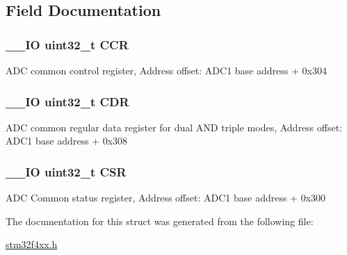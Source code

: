 \subsection{Field Documentation}
\hypertarget{struct_a_d_c___common___type_def_a5e1322e27c40bf91d172f9673f205c97}{
\subsubsection[{C\-C\-R}]{\setlength{\rightskip}{0pt plus 5cm}\-\_\-\-\_\-\-I\-O uint32\-\_\-t C\-C\-R}}\label{struct_a_d_c___common___type_def_a5e1322e27c40bf91d172f9673f205c97}
A\-D\-C common control register, Address offset\-: A\-D\-C1 base address + 0x304 \hypertarget{struct_a_d_c___common___type_def_a760f86a1a18dffffda54fc15a977979f}{
\subsubsection[{C\-D\-R}]{\setlength{\rightskip}{0pt plus 5cm}\-\_\-\-\_\-\-I\-O uint32\-\_\-t C\-D\-R}}\label{struct_a_d_c___common___type_def_a760f86a1a18dffffda54fc15a977979f}
A\-D\-C common regular data register for dual A\-N\-D triple modes, Address offset\-: A\-D\-C1 base address + 0x308 \hypertarget{struct_a_d_c___common___type_def_a876dd0a8546697065f406b7543e27af2}{
\subsubsection[{C\-S\-R}]{\setlength{\rightskip}{0pt plus 5cm}\-\_\-\-\_\-\-I\-O uint32\-\_\-t C\-S\-R}}\label{struct_a_d_c___common___type_def_a876dd0a8546697065f406b7543e27af2}
A\-D\-C Common status register, Address offset\-: A\-D\-C1 base address + 0x300 

The documentation for this struct was generated from the following file\-:\begin{DoxyCompactItemize}
\item 
\hyperlink{stm32f4xx_8h}{stm32f4xx.\-h}\end{DoxyCompactItemize}
